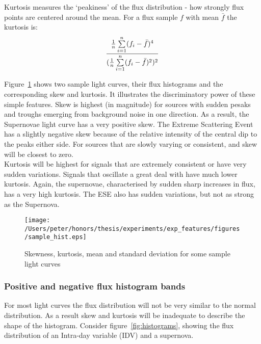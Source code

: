 	Kurtosis measures the `peakiness' of the flux distribution - how strongly flux points are centered around the mean. For a flux sample $f$ with mean $\bar{f}$ the kurtosis is:
	\begin{equation}
		\frac{\frac{1}{n}\sum\limits^{n}_{i=1}(f_{i} - \bar{f})^{4}}
		{(\frac{1}{n}\sum\limits^{n}_{i=1}(f_{i} - \bar{f})^{2})^{2}} \\
	\end{equation}
	
	Figure~\ref{fig:samplestats} shows two sample light curves, their flux histograms and the corresponding skew and kurtosis.  It illustrates the discriminatory power of these simple features.
	Skew is highest (in magnitude) for sources with sudden pesaks and troughs emerging from background noise in one direction. As a result, the Supernovae light curve has a very positive skew. The Extreme Scattering Event has a slightly negative skew because of the relative intensity of the central dip to the peaks either side. For sources that are slowly varying or consistent, and skew will be closest to zero. \\
	
	Kurtosis will be highest for signals that are extremely consistent or have very sudden variations. Signals that oscillate a great deal with have much lower kurtosis. Again, the supernovae, characterised by sudden sharp increases in flux, has a very high kurtosis. The ESE also has sudden variations, but not as strong as the Supernova. \\
		
	\begin{figure}[ht!]
		\label{fig:samplestats}
		\centering
		\texttt{[image: /Users/peter/honors/thesis/experiments/exp\_features/figures/sample\_hist.eps]}
		\caption{Skewness, kurtosis, mean and standard deviation for some sample light curves}
	\end{figure}
	
		
	\subsubsection{Positive and negative flux histogram bands}
		For most light curves the flux distribution will not be very similar to the normal distribution. As a result skew and kurtosis will be inadequate to describe the shape of the histogram. Consider figure~\ref{fig:histograms}, showing the flux distribution of an Intra-day variable (IDV) and a supernova.  \\
	
